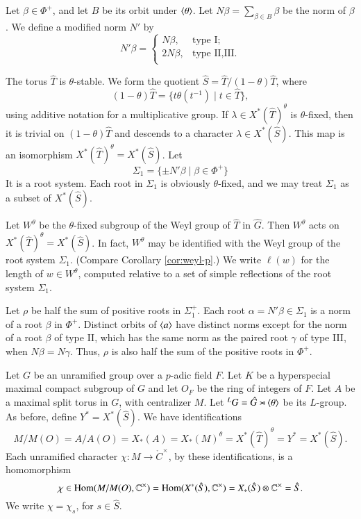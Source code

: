 Let $\beta\in\Phi^+$, and let $B$ be its orbit under $\langle{\theta}\rangle$.
Let $N\beta = \sum_{\beta\in B} \beta$ be the norm of $\beta$. 
We define a modified norm $N'$ by
\[
N'\beta = \begin{cases} 
N\beta, & \text{type I};\\
2N\beta, & \text{type II,III}.\\
\end{cases}
\]

The torus $\hat T$ is $\theta$-stable.  We form the quotient 
$\hat S = \hat T/(1-\theta) \hat T$, where
\[
(1-\theta)\hat T = \{ t\theta(t^{-1}) \mid t\in \hat T\},
\]
using additive notation for a multiplicative group.
If $\lambda\in X^*(\hat T)^\theta$ is $\theta$-fixed, then
it is trivial on $(1-\theta)\hat T$ and descends to a character $\lambda\in X^*(\hat S)$.
This map is an isomorphism $X^*(\hat T)^\theta = X^*(\hat S)$.
Let 
\[
\Sigma_1 = \{\pm N'\beta\mid \beta\in \Phi^+\}
\]
It is a root system.  Each root in $\Sigma_1$ is obviously $\theta$-fixed, and we
may treat $\Sigma_1$ as a subset of  $X^*(\hat S)$.

Let $W^\theta$ be the $\theta$-fixed subgroup of the Weyl group of $\hat T$ in $\hat G$.  
  Then $W^\theta$ acts on $X^*(\hat T)^\theta = X^*(\hat S)$.  In fact, $W^\theta$ may be
identified with the Weyl group of the root system $\Sigma_1$. (Compare Corollary \ref{cor:weyl-p}.)
We write $\ell(w)$ for the length of $w\in W^\theta$, computed relative to a set of simple reflections of the root system $\Sigma_1$.

Let $\rho$ be half the sum of positive roots in $\Sigma^+_1$.  Each root $\alpha = N'\beta\in \Sigma_1$ 
is a norm of a root $\beta$ in $\Phi^+$.
Distinct orbits of $\langle{a}\rangle$ have distinct norms except for the norm of a root $\beta$ of type II, which has the same norm as the
paired root $\gamma$ of type III, when $N\beta = N\gamma$.  Thus, $\rho$ is also half the sum of the positive roots in $\Phi^+$.


Let $G$ be an unramified group over a $p$-adic field $F$.
Let $K$ be a hyperspecial maximal compact subgroup of $G$ and let $O_F$ be the ring of integers of $F$.  
Let $A$ be a maximal split torus in $G$,
with centralizer $M$.  
Let ${}^LG = \hat G \rtimes \langle{\theta}\rangle$ be its $L$-group.
As before, define $Y^* = X^*(\hat S)$.
We have identifications
\begin{equation}\label{eqn:identify}
M/M(O)=A/A(O)=X_*(A)=X_*(M)^\theta  =X^*(\hat T)^\theta = Y^* = X^*(\hat S).
\end{equation}
Each unramified character $\chi:M\to \ring{C}^\times$, by these identifications, is a homomorphism
\begin{equation}
\chi\in{\operatorname{Hom}}(M/M(O),\mathbb{C}^\times) = {\operatorname{Hom}}(X^*(\hat S),\mathbb{C}^\times) = X_*(\hat S)\otimes \mathbb{C}^\times = \hat S.
\end{equation}
We write $\chi = \chi_s$, for $s\in\hat S$.





